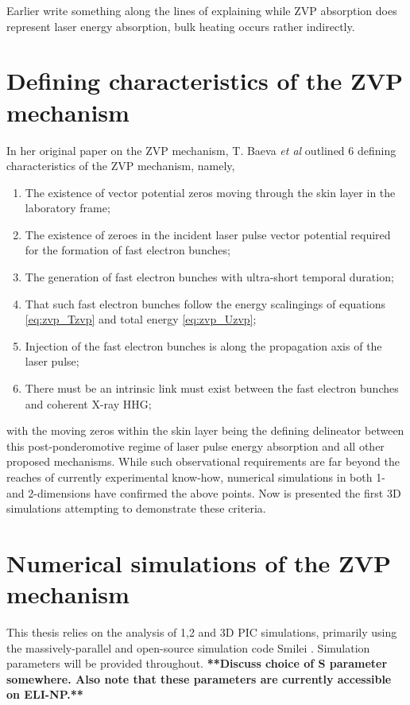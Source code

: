 Earlier write something along the lines of explaining while ZVP absorption does represent laser energy absorption, bulk heating occurs rather indirectly.

\section{Defining characteristics of the ZVP mechanism}
In her original paper on the ZVP mechanism, T. Baeva \textit{et al} \cite{baevaZeroVectorPotential2011} outlined 6 defining characteristics of the \ac{ZVP} mechanism, namely,
\begin{enumerate}
	\item The existence of vector potential zeros moving through the skin layer in the laboratory frame;
	\item The existence of zeroes in the incident laser pulse vector potential required for the formation of fast electron bunches;
	\item The generation of fast electron bunches with ultra-short temporal duration;
	\item That such fast electron bunches follow the energy scalingings of equations \ref{eq:zvp_Tzvp} and total energy \ref{eq:zvp_Uzvp};
	\item Injection of the fast electron bunches is along the propagation axis of the laser pulse;
	\item There must be an intrinsic link must exist between the fast electron bunches and coherent X-ray \ac{HHG};
\end{enumerate}
with the moving zeros within the skin layer being the defining delineator between this post-ponderomotive regime of laser pulse energy absorption and all other proposed mechanisms. While such observational requirements are far beyond the reaches of currently experimental know-how, numerical simulations in both 1- \cite{baevaZeroVectorPotential2011} and 2-dimensions \cite{savinAttosecondscaleAbsorptionExtreme2017} have confirmed the above points. Now is presented the first \ac{3D} simulations attempting to demonstrate these criteria.

\section{Numerical simulations of the ZVP mechanism}
This thesis relies on the analysis of 1,2 and 3D \ac{PIC} simulations, primarily using the massively-parallel and open-source simulation code Smilei \cite{derouillatSmileiCollaborativeOpensource2018}. Simulation parameters will be provided throughout.
\textbf{**Discuss choice of S parameter somewhere. Also note that these parameters are currently accessible on ELI-NP.**}
